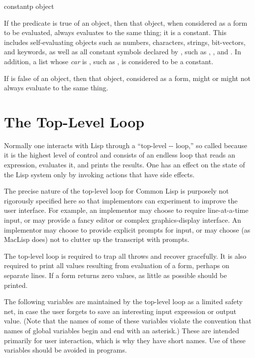 \begin{defun}[Function]
constantp object

If the predicate  is true of an object,
then that object, when considered as a form to
be evaluated, always evaluates to the same thing;
it is a constant.
This includes self-evaluating objects such as numbers, characters,
strings, bit-vectors, and keywords, as well as all constant symbols
declared by ,
such as , , and .
In addition, a list whose {\it car} is ,
such as , is considered to be a constant.

If  is false of an object, then
that object, considered as a form,
might or might not always evaluate to the same thing.
\end{defun}

\section{The Top-Level Loop}

Normally one interacts with Lisp through a ``top-level
-- loop,'' so called because
it is the highest level of control and consists of an endless
loop that reads an expression, evaluates it, and prints the
results.  One has an effect on the state of the Lisp system
only by invoking actions that have side effects.

The precise nature of the top-level loop for Common Lisp
is purposely not rigorously specified here so that implementors can
experiment to improve the user interface.
For example, an implementor may choose to require line-at-a-time
input, or may provide a fancy editor or complex graphics-display
interface.  An implementor may choose to provide
explicit prompts for input,
or may choose (as MacLisp does) not to clutter up the transcript
with prompts.

The top-level loop is required to trap all throws and recover gracefully.
It is also required to print all values resulting from evaluation of a form,
perhaps on separate lines.  If a form returns zero values, as little
as possible should be printed.

The following variables are maintained by the top-level loop
as a limited safety net, in case the user forgets to save an interesting input
expression or output value.  (Note that the names of some of these variables
violate the convention that names of global variables begin and end with
an asterisk.)  These are intended primarily for user interaction, which is why
they have short names.  Use of these variables should be avoided in programs.

